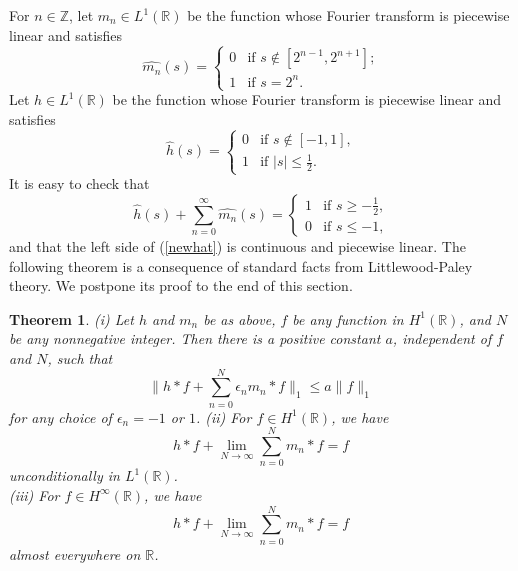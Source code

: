 \documentclass[12pt]{article}
\newcommand{\R}{\mathbb R}
\newcommand{\Z}{\mathbb Z}
\newtheorem{thm}[defin]{Theorem}
\begin{document}
 For $n\in\Z$,
let $m_n\in L^1(\R)$ be the function whose Fourier
transform is piecewise linear and satisfies
\begin{equation}
\widehat{m_n}(s)=\left\{
\begin{array}{ll}
0 & \mbox{if $s\not\in [2^{n-1},2^{n+1}]$;}\\
1 &  \mbox{if $s=2^n$.}
\end{array}
\right.
\label{mnHat}
\end{equation}
Let $h\in L^1(\R)$ be the function whose Fourier transform is piecewise
linear and satisfies
\begin{equation}
\widehat{h}(s)=\left\{
\begin{array}{ll}
0 & \mbox{if $s\not\in [-1,1]$,}\\
1 &  \mbox{if $|s|\leq \frac{1}{2}$.}
\end{array}
\right.
\label{anotherhhat}
\end{equation}
It is easy to check that
\begin{equation}
\widehat{h}(s)+\sum^\infty_{n=0} \widehat{m_n}(s)
=\left\{
\begin{array}{ll}
1 & \mbox{if $s\geq -\frac{1}{2}$,}\\
0 &  \mbox{if $s\leq -1 $,}
\end{array}
\right.
\label{newhat}
\end{equation}
and that the left side of 
(\ref{newhat}) is continuous and piecewise linear.
The following theorem is a consequence of 
standard facts from Littlewood-Paley theory.
We postpone its proof to the end of this section.

\begin{thm}
(i)  Let $h$ and $m_n$ be as above, 
$f$ be any function in $H^1(\R)$,
 and $N$ be any
nonnegative integer.  Then 
there is a 
positive constant $a$, independent of $f$ and $N$, such that
\begin{equation}
     \|h*f+ \sum^N_{n=0}
\epsilon_n m_n*f\|_1 \leq a \|f\|_1
\label{h1-conv}
\end{equation}
for any choice of $\epsilon_n=-1$ or $1$.
  (ii)  For
$f\in H^1(\R)$, we have
$$h*f+ \lim_{N\rightarrow\infty} \sum^N_{n=0}
m_n*f=f$$
unconditionally in $L^1(\R)$.  \\
(iii) For $f\in H^\infty (\R)$, we have
\begin{equation}
h*f+ \lim_{N\rightarrow\infty} \sum^N_{n=0}
m_n*f=f
\label{hinfty-conv}
\end{equation}
almost everywhere on $\R$.
\label{conv-hinfty}
\end{thm}
\end{document}
